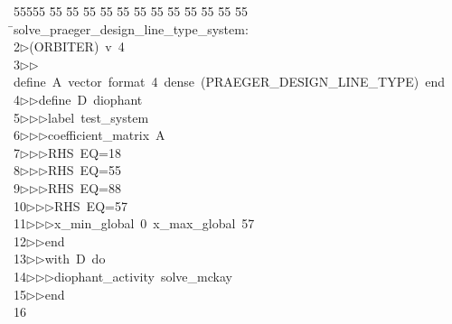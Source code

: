 %
%
\begin{tabbing}
55555 \= 55 \= 55 \= 55 \= 55 \= 55 \= 55 \= 55 \= 55 \= 55 \= 55 \= 55 \= 55 \= \>solve\_praeger\_design\_line\_type\_system:\\[0pt]
2\>$\triangleright$\>(ORBITER)\ v\ 4\ \\[0pt]
3\>$\triangleright$\>$\triangleright$\>define\ A\ vector\ format\ 4\ dense\ (PRAEGER\_DESIGN\_LINE\_TYPE)\ end\ \\[0pt]
4\>$\triangleright$\>$\triangleright$\>define\ D\ diophant\ \\[0pt]
5\>$\triangleright$\>$\triangleright$\>$\triangleright$\>label\ test\_system\ \\[0pt]
6\>$\triangleright$\>$\triangleright$\>$\triangleright$\>coefficient\_matrix\ A\ \\[0pt]
7\>$\triangleright$\>$\triangleright$\>$\triangleright$\>RHS\ EQ=18\ \\[0pt]
8\>$\triangleright$\>$\triangleright$\>$\triangleright$\>RHS\ EQ=55\ \\[0pt]
9\>$\triangleright$\>$\triangleright$\>$\triangleright$\>RHS\ EQ=88\ \\[0pt]
10\>$\triangleright$\>$\triangleright$\>$\triangleright$\>RHS\ EQ=57\ \\[0pt]
11\>$\triangleright$\>$\triangleright$\>$\triangleright$\>x\_min\_global\ 0\ x\_max\_global\ 57\ \\[0pt]
12\>$\triangleright$\>$\triangleright$\>end\ \\[0pt]
13\>$\triangleright$\>$\triangleright$\>with\ D\ do\ \\[0pt]
14\>$\triangleright$\>$\triangleright$\>$\triangleright$\>diophant\_activity\ solve\_mckay\ \\[0pt]
15\>$\triangleright$\>$\triangleright$\>end\\[0pt]
16\>\end{tabbing}
